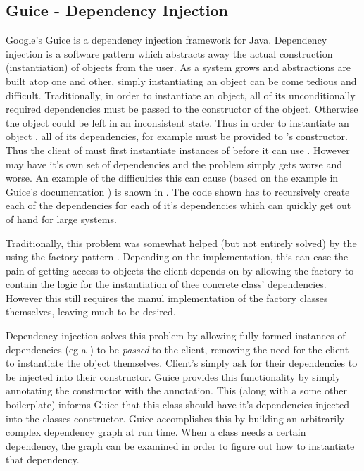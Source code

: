 \subsection{Guice - Dependency Injection}\label{sec:guice}
Google's Guice \cite{guice} is a dependency injection framework for Java. Dependency injection is a software pattern which abstracts away the actual construction (instantiation) of objects from the user. As a system grows and abstractions are built atop one and other, simply instantiating an object can be come tedious and difficult. Traditionally, in order to instantiate an object, all of its unconditionally required dependencies must be passed to the constructor of the object. Otherwise the object could be left in an inconsistent state. Thus in order to instantiate an object , all of its dependencies, for example  must be provided to 's constructor. Thus the client of  must first instantiate instances of  before it can use . However  may have it's own set of dependencies and the problem simply gets worse and worse. An example of the difficulties this can cause (based on the example in Guice's documentation \cite{guiceDocs}) is shown in . The code shown has to recursively create each of the dependencies for each of it's dependencies which can quickly get out of hand for large systems.



Traditionally, this problem was somewhat helped (but not entirely solved) by the using the factory pattern \cite{factoryMethodPattern}. Depending on the implementation, this can ease the pain of getting access to objects the client depends on by allowing the factory to contain the logic for the instantiation of thee concrete class' dependencies. However this still requires the manul implementation of the factory classes themselves, leaving much to be desired.


Dependency injection solves this problem by allowing fully formed instances of dependencies (eg a ) to be \textit{passed} to the client, removing the need for the client to instantiate the object themselves. Client's simply ask for their dependencies to be injected into their constructor. Guice provides this functionality by simply annotating the constructor with the  annotation. This (along with a some other boilerplate) informs Guice that this class should have it's dependencies injected into the classes constructor. Guice accomplishes this by building an arbitrarily complex dependency graph at run time. When a class needs a certain dependency, the graph can be examined in order to figure out how to instantiate that dependency. 


